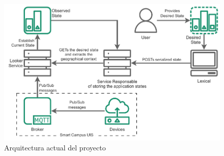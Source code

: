 \begin{figure}[ht]
    \centering
    \caption{Arquitectura actual del proyecto}
    \label{fig:StarDuckBasic}
    \includegraphics[width=\linewidth]{images/StarDuckBasic.pdf}
\end{figure}





